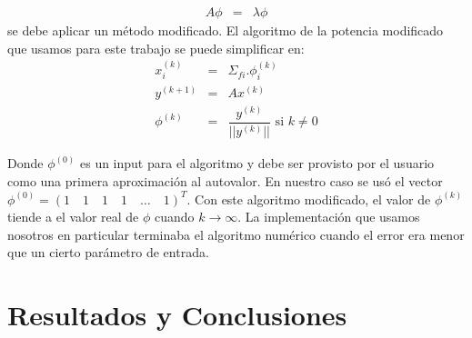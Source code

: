 \documentclass[11pt,a4paper]{emulateapj}
\begin{document}
\begin{eqnarray}
\label{eqn:problemaAutovalores}
A\phi &=& \lambda \phi
\end{eqnarray}
se debe aplicar un método modificado. El algoritmo de la potencia modificado que usamos para este trabajo se puede simplificar en:
\begin{eqnarray}
\label{eqn:algoritmoPotenciaModificado}
x_i^{(k)} &=& \Sigma_{fi}.\phi_i^{(k)} \\
y^{(k+1)} &=& Ax^{(k)}  \\
\phi^{(k)} &=& \dfrac{y^{(k)}}{||y^{(k)}||} \text{ si } k \neq 0
\end{eqnarray}

Donde $\phi^{(0)}$ es un input para el algoritmo y debe ser provisto por el usuario como una primera aproximación al autovalor. En nuestro caso se usó
el vector $\phi^{(0)} = (1\quad1\quad1\quad1\quad\dots\quad1)^T$. Con este algoritmo modificado, el valor de $\phi^{(k)}$ tiende a el valor real de $\phi$
cuando $k\rightarrow\infty$. La implementación que usamos nosotros en particular terminaba el algoritmo numérico cuando el error era menor que un cierto
parámetro de entrada. 
\section{Resultados y Conclusiones}
\label{sec:resultadosyconclusiones}
\end{document}
